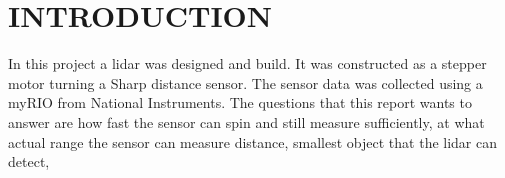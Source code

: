 \section{INTRODUCTION}

In this project a lidar was designed and build. It was constructed as a stepper motor turning a Sharp distance sensor. The sensor data was collected using a myRIO from National Instruments. The questions that this report wants to answer are how fast the sensor can spin and still measure sufficiently, at what actual range the sensor can measure distance, smallest object that the lidar can detect, 